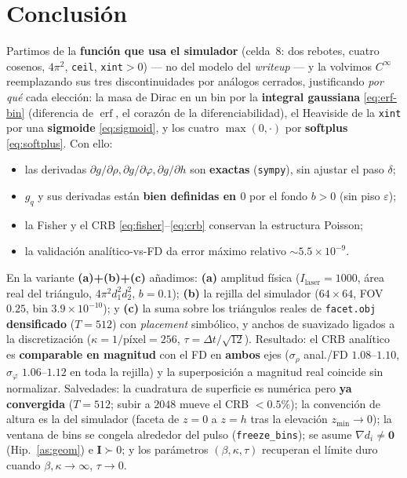 \documentclass[11pt,a4paper]{article}
\theoremstyle{plain}
\theoremstyle{definition}
\newcommand{\vect}[1]{\boldsymbol{#1}}
\newcommand{\matr}[1]{\mathbf{#1}}
\newcommand{\erf}{\operatorname{erf}}
\begin{document}
\section{Conclusi\'on}
\label{sec:conclusion}

Partimos de la \textbf{funci\'on que usa el simulador} (celda~8: dos rebotes,
cuatro cosenos, $4\pi^2$, \texttt{ceil}, \texttt{xint}$>0$) --- no del modelo del
\emph{writeup} --- y la volvimos $C^\infty$ reemplazando sus tres
discontinuidades por an\'alogos cerrados, justificando \emph{por qu\'e} cada
elecci\'on: la masa de Dirac en un bin por la \textbf{integral gaussiana}
\eqref{eq:erf-bin} (diferencia de $\erf$, el coraz\'on de la
diferenciabilidad), el Heaviside de la \texttt{xint} por una \textbf{sigmoide}
\eqref{eq:sigmoid}, y los cuatro $\max(0,\cdot)$ por \textbf{softplus}
\eqref{eq:softplus}. Con ello:
\begin{itemize}[nosep]
    \item las derivadas $\partial g/\partial\rho,\partial g/\partial\varphi,
          \partial g/\partial h$ son \textbf{exactas} (\texttt{sympy}), sin
          ajustar el paso $\delta$;
    \item $g_q$ y sus derivadas est\'an \textbf{bien definidas en $0$} por el
          fondo $b>0$ (sin piso $\varepsilon$);
    \item la Fisher y el CRB \eqref{eq:fisher}--\eqref{eq:crb} conservan la
          estructura Poisson;
    \item la validaci\'on anal\'itico-vs-FD da error m\'aximo relativo
          $\sim5.5\times10^{-9}$.
\end{itemize}
En la variante \textbf{(a)+(b)+(c)} a\~nadimos: \textbf{(a)} amplitud f\'isica
($I_{\mathrm{laser}}=1000$, \'area real del tri\'angulo, $4\pi^2 d_1^2 d_2^2$,
$b=0.1$); \textbf{(b)} la rejilla del simulador ($64\times64$, FOV $0.25$, bin
$3.9\times10^{-10}$); y \textbf{(c)} la suma sobre los tri\'angulos reales de
\texttt{facet.obj} \textbf{densificado} ($T=512$) con \emph{placement} simb\'olico,
y anchos de suavizado ligados a la discretizaci\'on ($\kappa=1/$p\'ixel$=256$,
$\tau=\Delta t/\sqrt{12}$). Resultado: el CRB anal\'itico es \textbf{comparable en
magnitud} con el FD en \textbf{ambos} ejes ($\sigma_\rho$ anal./FD $1.08$--$1.10$,
$\sigma_\varphi$ $1.06$--$1.12$ en toda la rejilla) y la superposici\'on a magnitud
real coincide sin normalizar. Salvedades: la cuadratura de superficie es num\'erica pero
\textbf{ya convergida} ($T=512$; subir a $2048$ mueve el CRB $<0.5\%$); la
convenci\'on de altura es la del simulador (faceta de $z=0$ a $z=h$ tras la
elevaci\'on $z_{\min}\!\to\!0$); la ventana de bins se congela alrededor del pulso
(\texttt{freeze\_bins}); se asume $\nabla d_i\neq\vect0$ (Hip.~\ref{as:geom}) e
$\matr{I}\succ0$; y los par\'ametros $(\beta,\kappa,\tau)$ recuperan el l\'imite
duro cuando $\beta,\kappa\to\infty$, $\tau\to0$.
\end{document}
